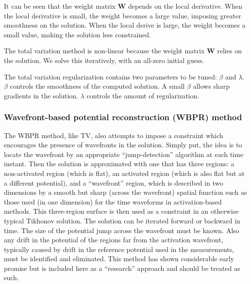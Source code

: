It can be seen that the weight matrix $\mathbf{W}$ depends on the local
derivative. When the local derivative is small, the weight becomes a large
value, imposing greater smoothness on the solution. When the local derive
is large, the weight becomes a small value, making the solution less
constrained.

The total variation method is non-linear because the weight matrix
$\mathbf{W}$ relies on the solution. We solve this iteratively, with an all-zero initial
guess.

The total variation regularization contains two parameters to be tuned:
$\beta$ and $\lambda$. $\beta$ controls the smoothness of the computed
solution. A small $\beta$ allows sharp gradients in the solution. $\lambda$
controls the amount of regularization.

\subsubsection{Wavefront-based potential reconstruction (WBPR) method}

The WBPR method, like TV, also attempts to impose a constraint which
encourages the presence of wavefronts in the solution. Simply put, the idea
is to locate the wavefront by an appropriate ``jump-detection'' algorithm at each time instant.
Then the solution is approximated with one that has three regions: a non-activated region (which is flat), an
activated region (which is also flat but at a different potential), and a
``wavefront'' region, which is described in two dimensions by a smooth but
sharp (across the wavefront) spatial function such as those used (in one
dimension) for the time waveforms in activation-based methods. This
three-region surface is then used as a constraint in an otherwise typical
Tikhonov solution. The solution can be iterated forward or backward in
time.
The size of the potential jump across the wavefront must be known.
Also any drift in the potential of the regions far from the
activation wavefront, typically caused by drift in the reference potential
used in the measurements, must be identified and eliminated. This method has
shown considerable early promise but is included here as a ``research''
approach and should be treated as such.
